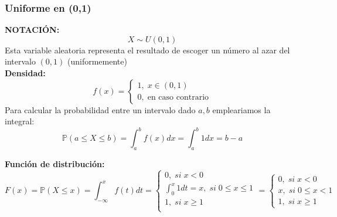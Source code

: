 \documentclass[11pt]{article}
\newcommand{\prob}{\mathbb{P}}
\theoremstyle{plain}
\begin{document}
                \subsubsection{Uniforme en (0,1)} %
                \label{subsub:uniforme_en_}
                    \textbf{NOTACIÓN:} \[X \sim U(0,1)\]
                    Esta variable aleatoria representa el resultado de escoger un número al azar del intervalo $(0,1)$ (uniformemente)\\
                    \textbf{Densidad:}
                    \begin{equation}
                        f(x) =
                        \begin{cases}
                            1, \; x\in(0,1)\\
                            0, \; \text{en caso contrario}
                        \end{cases} \nonumber
                    \end{equation}
                    Para calcular la probabilidad entre un intervalo dado $a,b$ empleariamos la integral:
                    \[\prob(a\le X\le b) = \int_a^b f(x) dx = \int_a^b 1 dx = b-a\]

                    \textbf{Función de distribución:}
                    \begin{equation}
                        F(x) = \prob(X\le x) = \int_{-\infty}^x f(t) dt =
                        \begin{cases}
                            0, \; si \; x<0\\
                            \int_0^x 1 dt = x, \; si \; 0\le x \le 1\\
                            1, \; si \; x\ge 1\\
                        \end{cases}
                        =
                        \begin{cases}
                            0, \; si \; x<0\\
                            x, \; si \; 0\le x<1\\
                            1, \; si \; x \ge 1
                        \end{cases}\nonumber
                    \end{equation}
\end{document}
